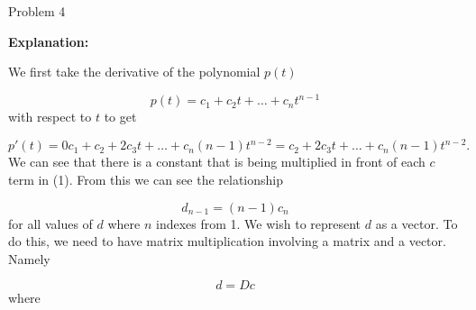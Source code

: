 \begin{problem}{Problem 4}
\begin{Highlight}[Solution]
        \noindent \textbf{Explanation:} \vspace*{1em}

        We first take the derivative of the polynomial $p(t)$ 
        
        \begin{equation*}
            p(t) = c_{1} + c_{2}t + \dots + c_{n}t^{n-1}
        \end{equation*}
        with respect to $t$ to get

        \setcounter{equation}{0}
        \begin{equation}
            p'(t) = 0c_{1} + c_{2} + 2c_{3}t + \dots + c_{n}(n-1)t^{n-2} = c_{2} + 2c_{3}t + \dots + c_{n}(n-1)t^{n-2}.
        \end{equation}
        We can see that there is a constant that is being multiplied in front of each $c$ term in (1). From this we can see the relationship 

        \begin{equation}
            d_{n - 1} = (n - 1)c_{n}
        \end{equation}
        for all values of $d$ where $n$ indexes from 1. We wish to represent $d$ as a vector. To do this, we need to have matrix multiplication involving a matrix and a vector. Namely

        \begin{equation}
            d = Dc
        \end{equation}
        where


\end{Highlight}
\end{problem}
